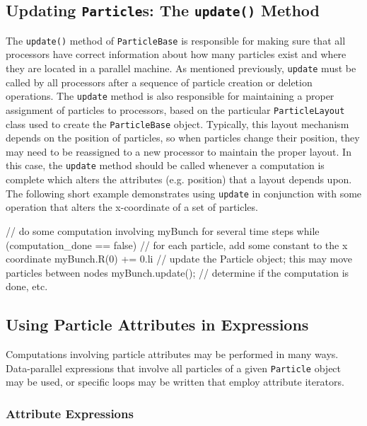 \subsection{Updating \texttt{Particle}s: The \texttt{update()} Method}

The \texttt{update()} method of \texttt{ParticleBase} is responsible for making sure that all processors have correct information about how many particles exist and where they are located in a parallel machine. As mentioned previously, \texttt{update} must be called by all processors after a sequence of particle creation or deletion operations. The \texttt{update} method is also responsible for maintaining a proper assignment of particles to processors, based on the particular
\texttt{ParticleLayout} class used to create the
\texttt{ParticleBase} object. Typically, this layout mechanism depends on the position of particles, so when particles change their position, they may need to be reassigned to a new processor to maintain the proper layout. In this case, the \texttt{update} method should be called whenever a computation is complete which alters the attributes (e.g. position) that a layout depends upon. The following short example demonstrates using \texttt{update} in conjunction with some operation that alters the x-coordinate of a
set of particles. \\
\begin{code}
// do some computation involving myBunch for several time steps
while (computation_done == false) {
    // for each particle, add some constant to the x coordinate
    myBunch.R(0) += 0.li
    // update the Particle object; this may move particles between nodes
    myBunch.update();
    // determine if the computation is done, etc.
}
\end{code}

\subsection{Using Particle Attributes in Expressions}

Computations involving particle attributes may be performed in many ways. Data-parallel expressions that involve all particles of a given \texttt{Particle} object may be used, or specific loops may be written that employ attribute iterators.


\subsubsection{Attribute Expressions}

